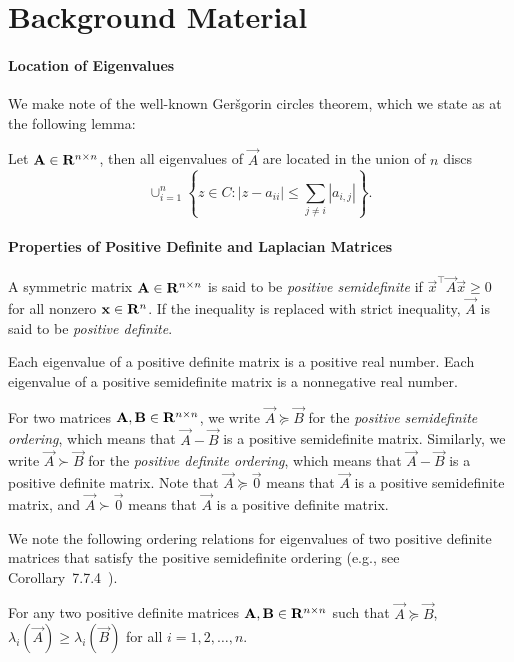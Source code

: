 \appendix

\section{Background Material}
\label{sec:back}

\paragraph{Location of Eigenvalues} We make note of the well-known Ger\v sgorin circles theorem, which we state as at the following lemma:

\begin{lemma} Let $\mathbf{A}\in \mathbf{R}^{n\times n}$, then all eigenvalues of $\vec{A}$ are located in the union of $n$ discs
$$
\cup_{i=1}^n \left\{z\in C: |z-a_{ii}| \leq \sum_{j\neq i} |a_{i,j}|\right\}.
$$
\label{lem:gersgorin}
\end{lemma}

\paragraph{Properties of Positive Definite and Laplacian Matrices} A symmetric matrix $\mathbf{A}\in \mathbf{R}^{n\times n}$ is said to be \emph{positive semidefinite} if $
\vec{x}^\top \vec{A} \vec{x} \geq 0$ for all nonzero $\mathbf{x}\in \mathbf{R}^n$. If the inequality is replaced with strict inequality, $\vec{A}$ is said to be \emph{positive definite}. 

Each eigenvalue of a positive definite matrix is a positive real number. Each eigenvalue of a positive semidefinite matrix is a nonnegative real number. 

For two matrices $\mathbf{A},\mathbf{B}\in \mathbf{R}^{n\times n}$, we write $\vec{A} \succeq \vec{B}$ for the \emph{positive semidefinite ordering}, which means that $\vec{A} - \vec{B}$ is a positive semidefinite matrix. Similarly, we write $\vec{A} \succ \vec{B}$ for the \emph{positive definite ordering}, which means that $\vec{A}-\vec{B}$ is a positive definite matrix. Note that $\vec{A} \succeq \vec{0}$ means that $\vec{A}$ is a positive semidefinite matrix, and $\vec{A}\succ \vec{0}$ means that $\vec{A}$ is a positive definite matrix.

We note the following ordering relations for eigenvalues of two positive definite matrices that satisfy the positive semidefinite ordering (e.g., see Corollary~7.7.4~\cite{horn}).

\begin{lemma} For any two positive definite matrices $\mathbf{A},\mathbf{B}\in \mathbf{R}^{n\times n}$ such that $\vec{A}\succeq \vec{B}$, $\lambda_i(\vec{A})\geq \lambda_i(\vec{B})$ for all $i = 1,2,\ldots,n$.
\label{lem:EigAsuccB}
\end{lemma}

